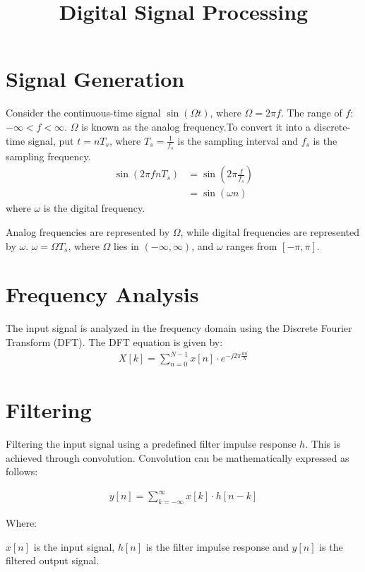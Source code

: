 \documentclass{article}
\title{Digital Signal Processing }
\author{}
\date{}
\begin{document}
\maketitle
\fi
\section{Signal Generation}

Consider the continuous-time signal \(\sin(\Omega t)\), where \(\Omega = 2\pi f\).
The range of \(f\): \(-\infty < f < \infty\).
\(\Omega\) is known as the analog frequency.To convert it into a discrete-time signal, put \(t = nT_s\), where \(T_s = \frac{1}{f_s}\) is the sampling interval and \(f_s\) is the sampling frequency.
\begin{align}
\sin(2\pi fnT_s) &= \sin(2\pi \frac{f}{f_s}) \\
&= \sin(\omega n)
\end{align}
where \(\omega\) is the digital frequency.

Analog frequencies are represented by \(\Omega\), while digital frequencies are represented by \(\omega\).
\(\omega = \Omega T_s\), where \(\Omega\) lies in \((- \infty, \infty)\), and \(\omega\) ranges from \([- \pi, \pi]\).

  \section{Frequency Analysis}
The input signal is analyzed in the frequency domain using the Discrete Fourier Transform (DFT). The DFT equation is given by:
\begin{align}
X[k] = \sum_{n=0}^{N-1} x[n] \cdot e^{-j2\pi \frac{kn}{N}}
\end{align}
\section{Filtering}
Filtering the input signal using a predefined filter impulse response $h$. This is achieved through convolution. Convolution can be mathematically expressed as follows:

\begin{align}
y[n] = \sum_{k=-\infty}^{\infty} x[k] \cdot h[n - k]
\end{align}

Where:

    $x[n]$ is the input signal,
    $h[n]$ is the filter impulse response and
    $y[n]$ is the filtered output signal.
\end{document}
